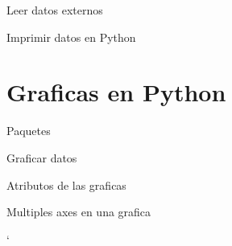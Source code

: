 \documentclass[
10pt,
aspectratio=169,
]{beamer}
\begin{document}
\begin{frame}[c]{Leer datos externos}
\end{frame}

\begin{frame}[c]{Imprimir datos en Python}
\end{frame}

\section{Graficas en Python}
\begin{frame}[c]{Paquetes}
\end{frame}

\begin{frame}[c]{Graficar datos}
\end{frame}

\begin{frame}[c]{Atributos de las graficas}
\end{frame}

\begin{frame}[c]{Multiples axes en una grafica}
\end{frame}




`
\end{document}
